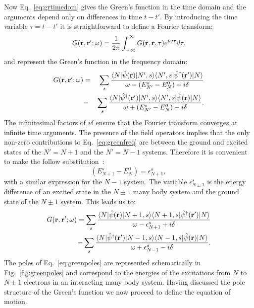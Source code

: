 %
Now Eq.~\ref{eq:grtimedom} gives the Green's function in the time domain and the arguments depend 
only on differences in time $t-t'$. By introducing the time variable $\tau = t-t'$ it is 
straightforward to define a Fourier transform:
%
\begin{equation}
G({\bf r},{\bf r}';\omega) = \frac{1}{2\pi} \int_{-\infty}^{\infty} G({\bf r},{\bf r},\tau) e^{i\omega\tau} d\tau,
\end{equation}
%
and represent the Green's function in the frequency domain:
%
\begin{eqnarray}
\label{eq:greenfreq}
G({\bf r},{\bf r^\prime};\omega) & = &\sum_{s} \frac{\langle N|\hat{\psi}({\bf r}) |N',s\rangle \langle N',s|\hat{\psi}^{\dagger}({\bf r}')| N \rangle}{\omega - (E^{s}_{N'} - E^{0}_{N}) + i\delta} \nonumber \\
	  		   & - & \sum_{s}\frac{\langle N|\hat{\psi}^{\dagger}({\bf r}') |N',s\rangle \langle N',s|\hat{\psi}({\bf r})| N \rangle}{\omega + (E^{s}_{N'} - E^{0}_{N}) - i\delta}.
\end{eqnarray}
%
The infinitesimal factors of $i\delta$ ensure that the Fourier 
transform converges at infinite time arguments.
The presence of the field operators implies that the only 
non-zero contributions to Eq.~\ref{eq:greenfreq} are between 
the ground and excited states of the $N'=N+1$ and the $N'=N-1$ systems. 
Therefore it is convenient to make the follow substitution~\cite{inkson86}:
%
\begin{equation}
(E^{s}_{N+1} - E^{0}_{N}) = \epsilon^{s}_{N+1},
\end{equation}
%
with a similar expression for the $N-1$ system. The variable $\epsilon^{s}_{N\pm1}$ 
is the energy difference of an excited state in the $N\pm1$ many body system and 
the ground state of the $N\pm1$ system. 
This leads us to:
%
\begin{eqnarray}
\label{eq:greenpoles}
G({\bf r},{\bf r^\prime};\omega) = \sum_{s} \frac{\langle N|\hat{\psi}({\bf r}) |N+1,s\rangle \langle N+1,s|\hat{\psi}^{\dagger}({\bf r}')| N \rangle}{\omega - \epsilon^{s}_{N+1} + i\delta} \nonumber \\
			 		-\sum_{s} \frac{\langle N|\hat{\psi}^{\dagger}({\bf r}')|N-1,s\rangle \langle N-1,s|\hat{\psi}({\bf r})| N \rangle}{\omega + \epsilon^{s}_{N-1} - i\delta}.
\end{eqnarray}
%
The poles of Eq.~\ref{eq:greenpoles} are represented schematically in Fig.~\ref{fig:greenpoles} 
and correspond to the energies of the excitations from $N$ to $N\pm1$ electrons 
in an interacting many body system. Having discussed the pole structure of 
the Green's function we now proceed to define the equation of motion.

